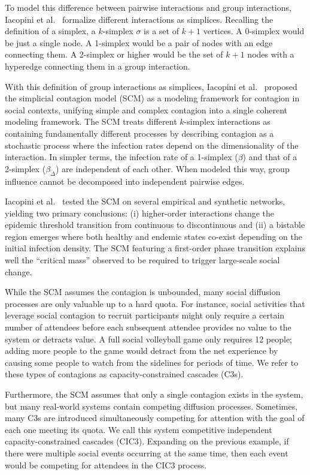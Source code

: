 \documentclass[sigconf]{acmart}
\begin{document}
To model this difference between pairwise interactions and group interactions, Iacopini et al.~\cite{iacopini2019} formalize different interactions as simplices. Recalling the definition of a simplex, a $k$-simplex $\sigma$ is a set of $k+1$ vertices. A 0-simplex would be just a single node. A 1-simplex would be a pair of nodes with an edge connecting them. A 2-simplex or higher would be the set of $k+1$ nodes with a hyperedge connecting them in a group interaction.

With this definition of group interactions as simplices, Iacopini et al.~\cite{iacopini2019} proposed the simplicial contagion model (SCM) as a modeling framework for contagion in social contexts, unifying simple and complex contagion into a single coherent modeling framework. The SCM treats different $k$-simplex interactions as containing fundamentally different processes by describing contagion as a stochastic process where the infection rates depend on the dimensionality of the interaction. In simpler terms, the infection rate of a 1-simplex ($\beta$) and that of a 2-simplex ($\beta_{\Delta}$) are independent of each other. When modeled this way, group influence cannot be decomposed into independent pairwise edges.

Iacopini et al.~\cite{iacopini2019} tested the SCM on several empirical and synthetic networks, yielding two primary conclusions: (i) higher-order interactions change the epidemic threshold transition from continuous to discontinuous and (ii) a bistable region emerges where both healthy and endemic states co-exist depending on the initial infection density. The SCM featuring a first-order phase transition explains well the ``critical mass'' observed to be required to trigger large-scale social change.

While the SCM assumes the contagion is unbounded, many social diffusion processes are only valuable up to a hard quota. For instance, social activities that leverage social contagion to recruit participants might only require a certain number of attendees before each subsequent attendee provides no value to the system or detracts value. A full social volleyball game only requires 12 people; adding more people to the game would detract from the net experience by causing some people to watch from the sidelines for periods of time. We refer to these types of contagions as capacity-constrained cascades (C3s).

Furthermore, the SCM assumes that only a single contagion exists in the system, but many real-world systems contain competing diffusion processes. Sometimes, many C3s are introduced simultaneously competing for attention with the goal of each one meeting its quota. We call this system competitive independent capacity-constrained cascades (CIC3). Expanding on the previous example, if there were multiple social events occurring at the same time, then each event would be competing for attendees in the CIC3 process.
\end{document}
